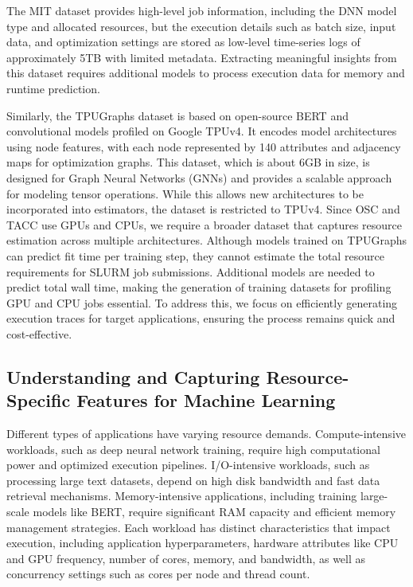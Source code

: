 The MIT dataset provides high-level job information, including the DNN model type and allocated resources, but the execution details such as batch size, input data, and optimization settings are stored as low-level time-series logs of approximately 5TB with limited metadata. Extracting meaningful insights from this dataset requires additional models to process execution data for memory and runtime prediction.

Similarly, the TPUGraphs dataset is based on open-source BERT and convolutional models profiled on Google TPUv4. It encodes model architectures using node features, with each node represented by 140 attributes and adjacency maps for optimization graphs. This dataset, which is about 6GB in size, is designed for Graph Neural Networks (GNNs) and provides a scalable approach for modeling tensor operations. While this allows new architectures to be incorporated into estimators, the dataset is restricted to TPUv4. Since OSC and TACC use GPUs and CPUs, we require a broader dataset that captures resource estimation across multiple architectures. Although models trained on TPUGraphs can predict fit time per training step, they cannot estimate the total resource requirements for SLURM job submissions. Additional models are needed to predict total wall time, making the generation of training datasets for profiling GPU and CPU jobs essential. To address this, we focus on efficiently generating execution traces for target applications, ensuring the process remains quick and cost-effective.

\subsection{Understanding and Capturing Resource-Specific Features for Machine Learning}

Different types of applications have varying resource demands. Compute-intensive workloads, such as deep neural network training, require high computational power and optimized execution pipelines. I/O-intensive workloads, such as processing large text datasets, depend on high disk bandwidth and fast data retrieval mechanisms. Memory-intensive applications, including training large-scale models like BERT, require significant RAM capacity and efficient memory management strategies. Each workload has distinct characteristics that impact execution, including application hyperparameters, hardware attributes like CPU and GPU frequency, number of cores, memory, and bandwidth, as well as concurrency settings such as cores per node and thread count.

